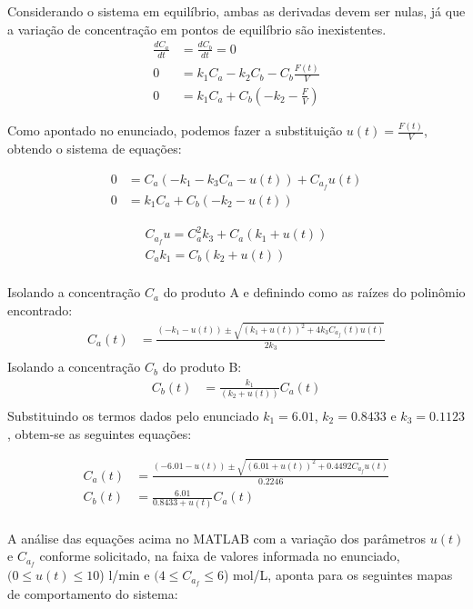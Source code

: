 \documentclass[a4paper,12pt]{report}
\begin{document}
Considerando o sistema em equilíbrio, ambas as derivadas devem ser nulas, já que a variação de concentração em pontos de equilíbrio são inexistentes.\\

\begin{align}
\frac{dC_a}{dt} &= \frac{dC_b}{dt} = 0 \\
0 &= k_1 C_a - k_2 C_b - C_b  \frac{F(t)}{V} \\
0 &= k_1 C_a + C_b(-k_2 - \frac{F}{V})
\end{align}

Como apontado no enunciado, podemos fazer a substituição \(u(t) = \frac{F(t)}{V}\), obtendo o sistema de equações:

\begin{align}
0 &= C_a(-k_1 - k_3 C_a -  u(t)) + C_{a_f} u(t) \\
0 &= k_1 C_a + C_b(-k_2 - u(t))
\end{align}

\begin{align}
C_{a_f} u = C_a^2 k_3 + C_a (k_1 + u(t))\\
C_a k_1 = C_b(k_2 + u(t))\\
\end{align}

Isolando a concentração \( C_a \) do produto A e definindo como as raízes do polinômio encontrado:\\
\begin{align}
C_a(t) &= \frac{(-k_1 - u(t)) \pm \sqrt{(k_1+u(t))^2 + 4 k_3 C_{a_f}(t) u(t)}}{2 k_3}\\
\end{align}
 Isolando a concentração \( C_b \) do produto B:\\
\begin{align}
C_b(t) &= \frac{k_1}{(k_2 + u(t))}C_a(t)\\
\end{align}
Substituindo os termos dados pelo enunciado \(k_1 = 6.01\), \(k_2 = 0.8433\) e \(k_3 = 0.1123\), obtem-se as seguintes equações:

\begin{align}
C_a(t) &= \frac{(-6.01-u(t)) \pm \sqrt{(6.01+u(t))^2+0.4492 C_{a_f} u(t)}}{0.2246}\\
C_b(t) &= \frac{6.01}{0.8433+u(t)} C_a(t)\\
\end{align}

A análise das equações acima no MATLAB com a variação dos parâmetros \(u(t)\) e \(C_{a_f}\) conforme solicitado, na faixa de valores informada no enunciado, \((0 \leq u(t) \leq 10\)) l/min e \((4 \leq C_{a_f} \leq 6\)) mol/L, aponta para os seguintes mapas de comportamento do sistema:
\end{document}
